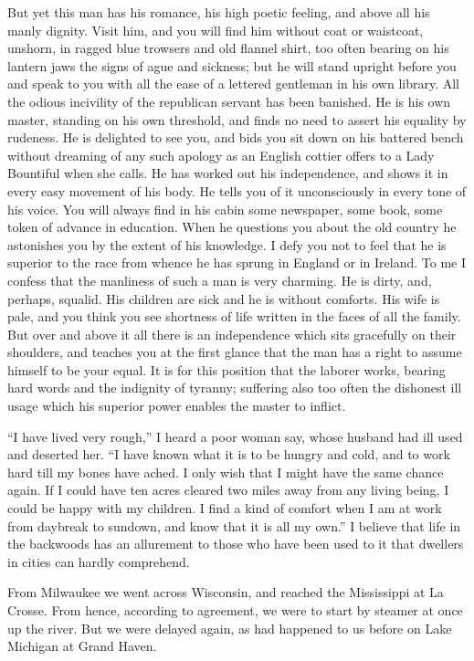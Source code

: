 But yet this man has his romance, his high poetic feeling, and
above all his manly dignity.  Visit him, and you will find him
without coat or waistcoat, unshorn, in ragged blue trowsers and old
flannel shirt, too often bearing on his lantern jaws the signs of
ague and sickness; but he will stand upright before you and speak
to you with all the ease of a lettered gentleman in his own
library.  All the odious incivility of the republican servant has
been banished.  He is his own master, standing on his own
threshold, and finds no need to assert his equality by rudeness.
He is delighted to see you, and bids you sit down on his battered
bench without dreaming of any such apology as an English cottier
offers to a Lady Bountiful when she calls.  He has worked out his
independence, and shows it in every easy movement of his body.  He
tells you of it unconsciously in every tone of his voice.  You will
always find in his cabin some newspaper, some book, some token of
advance in education.  When he questions you about the old country
he astonishes you by the extent of his knowledge.  I defy you not
to feel that he is superior to the race from whence he has sprung
in England or in Ireland.  To me I confess that the manliness of
such a man is very charming.  He is dirty, and, perhaps, squalid.
His children are sick and he is without comforts.  His wife is
pale, and you think you see shortness of life written in the faces
of all the family.  But over and above it all there is an
independence which sits gracefully on their shoulders, and teaches
you at the first glance that the man has a right to assume himself
to be your equal.  It is for this position that the laborer works,
bearing hard words and the indignity of tyranny; suffering also too
often the dishonest ill usage which his superior power enables the
master to inflict.

``I have lived very rough,'' I heard a poor woman say, whose husband
had ill used and deserted her.  ``I have known what it is to be
hungry and cold, and to work hard till my bones have ached.  I only
wish that I might have the same chance again.  If I could have ten
acres cleared two miles away from any living being, I could be
happy with my children.  I find a kind of comfort when I am at work
from daybreak to sundown, and know that it is all my own.''  I
believe that life in the backwoods has an allurement to those who
have been used to it that dwellers in cities can hardly comprehend.

From Milwaukee we went across Wisconsin, and reached the
Mississippi at La Crosse.  From hence, according to agreement, we
were to start by steamer at once up the river.  But we were delayed
again, as had happened to us before on Lake Michigan at Grand
Haven.



